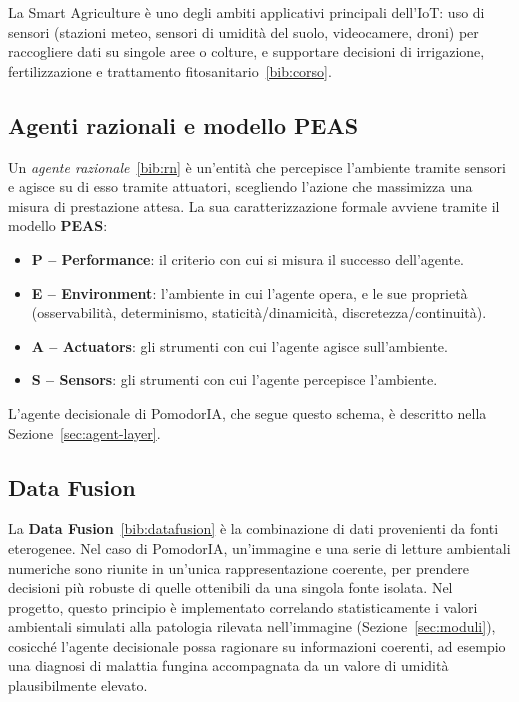 La Smart Agriculture è uno degli ambiti applicativi principali dell'IoT: uso
di sensori (stazioni meteo, sensori di umidità del suolo, videocamere,
droni) per raccogliere dati su singole aree o colture, e supportare decisioni
di irrigazione, fertilizzazione e trattamento fitosanitario~\ref{bib:corso}.

\subsection{Agenti razionali e modello PEAS}
\label{sec:peas}

Un \emph{agente razionale}~\ref{bib:rn} è un'entità che percepisce
l'ambiente tramite sensori e agisce su di esso tramite attuatori, scegliendo
l'azione che massimizza una misura di prestazione attesa. La sua
caratterizzazione formale avviene tramite il modello \textbf{PEAS}:

\begin{itemize}
    \item \textbf{P -- Performance}: il criterio con cui si misura il
    successo dell'agente.
    \item \textbf{E -- Environment}: l'ambiente in cui l'agente opera, e le
    sue proprietà (osservabilità, determinismo, staticità/dinamicità,
    discretezza/continuità).
    \item \textbf{A -- Actuators}: gli strumenti con cui l'agente agisce
    sull'ambiente.
    \item \textbf{S -- Sensors}: gli strumenti con cui l'agente percepisce
    l'ambiente.
\end{itemize}

L'agente decisionale di PomodorIA, che segue questo schema, è
descritto nella Sezione~\ref{sec:agent-layer}.

\subsection{Data Fusion}

La \textbf{Data Fusion}~\ref{bib:datafusion} è la combinazione di dati
provenienti da fonti eterogenee. Nel caso di PomodorIA, un'immagine e una
serie di letture ambientali numeriche sono riunite in un'unica rappresentazione
coerente, per prendere decisioni più robuste di quelle ottenibili da una
singola fonte isolata. Nel progetto, questo principio è implementato
correlando statisticamente i valori ambientali simulati alla patologia
rilevata nell'immagine (Sezione~\ref{sec:moduli}), cosicché l'agente
decisionale possa ragionare su informazioni coerenti, ad esempio
una diagnosi di malattia fungina accompagnata da un valore di umidità
plausibilmente elevato.

